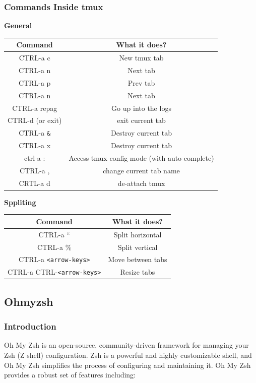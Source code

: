 \documentclass{article}
\begin{document}
\subsubsection{Commands Inside tmux}
\textbf{General}
\begin{table}[H]
\begin{tabular}{| c  |c  |}
\hline
\textbf{Command} & \textbf{What it does?} \\ \hline
CTRL-a c & New tmux tab \\
CTRL-a n & Next tab \\
CTRL-a p & Prev tab \\
CTRL-a n & Next tab \\
CTRL-a repag & Go up into the logs \\
CTRL-d (or exit) & exit current tab \\
CTRL-a \verb|&| & Destroy current tab \\
CTRL-a x & Destroy current tab \\
ctrl-a : & Access tmux config mode (with auto-complete) \\
CTRL-a , & change current tab name \\
CRTL-a d & de-attach tmux \\
\hline
\end{tabular}
\end{table}

\textbf{Sppliting}
\begin{table}[H]
\begin{tabular}{| c  |c  |}
\hline
\textbf{Command} & \textbf{What it does?} \\ \hline
CTRL-a “ & Split horizontal \\
CTRL-a \% & Split vertical \\
CTRL-a \verb|<arrow-keys>| & Move between tabs \\
CTRL-a CTRL-\verb|<arrow-keys>| & Resize tabs \\
\hline
\end{tabular}
\end{table}

\subsection{Ohmyzsh}

\subsubsection{Introduction}

Oh My Zsh is an open-source, community-driven framework for managing your Zsh (Z shell) configuration. Zsh is a powerful and highly customizable shell, and Oh My Zsh simplifies the process of configuring and maintaining it. Oh My Zsh provides a robust set of features including:
\end{document}
